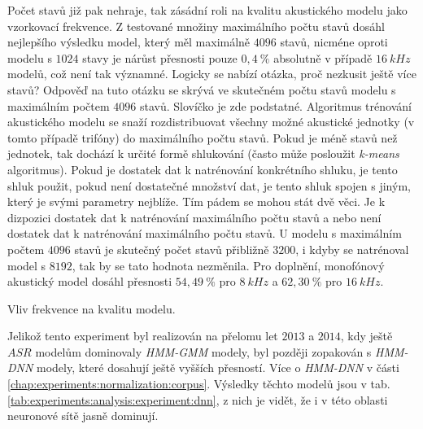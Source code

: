 Počet stavů již pak nehraje, tak zásádní roli na kvalitu akustického modelu jako vzorkovací frekvence. Z testované množiny maximálního počtu stavů dosáhl nejlepšího výsledku model, který měl maximálně $4096$ stavů, nicméne oproti modelu s $1024$ stavy je nárůst přesnosti pouze $0,4\ \%$ absolutně v případě $16\ kHz$ modelů, což není tak významné. Logicky se nabízí otázka, proč nezkusit ještě více stavů? Odpověď na tuto otázku se skrývá ve skutečném počtu stavů modelu s maximálním počtem $4096$ stavů. Slovíčko  je zde podstatné. Algoritmus trénování akustického modelu se snaží rozdistribuovat všechny možné akustické jednotky (v tomto případě trifóny) do maximálního počtu stavů. Pokud je méně stavů než jednotek, tak dochází k určité formě shlukování (často může posloužit \textit{k-means} algoritmus). Pokud je dostatek dat k natrénování konkrétního shluku, je tento shluk použit, pokud není dostatečné množství dat, je tento shluk spojen s jiným, který je svými parametry nejblíže. Tím pádem se mohou stát dvě věci. Je k dizpozici dostatek dat k natrénování maximálního počtu stavů a nebo není dostatek dat k natrénování maximálního počtu stavů. U modelu s maximálním počtem $4096$ stavů je skutečný počet stavů přibližně $3200$, i kdyby se natrénoval model s $8192$, tak by se tato hodnota nezměnila. Pro doplnění, monofónový akustický model dosáhl přesnosti $54,49\ \%$ pro $8\ kHz$ a $62,30\ \%$ pro $16\ kHz$.

\begin{table}[htpb]
  \centering
  \def\arraystretch{1.5}
  \caption{Vliv frekvence na kvalitu modelu.}
  \label{tab:experiments:analysis:experiment:gmm}
\end{table}

Jelikož tento experiment byl realizován na přelomu let $2013$ a $2014$, kdy ještě $ASR$ modelům dominovaly \textit{HMM-GMM} modely, byl později zopakován s \textit{HMM-DNN} modely, které dosahují ještě vyšších přesností. Více o \textit{HMM-DNN} v části \ref{chap:experiments:normalization:corpus}. Výsledky těchto modelů jsou v tab. \ref{tab:experiments:analysis:experiment:dnn}, z nich je vidět, že i v této oblasti neuronové sítě jasně dominují.

